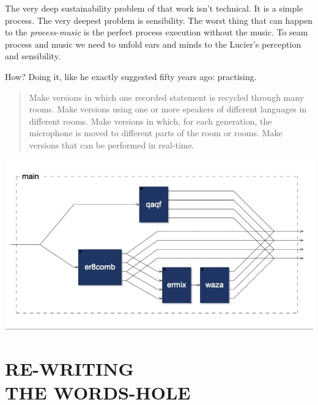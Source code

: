 \documentclass[
	a0,
	portrait
	]{a0poster}
\begin{document}
\begin{multicols}{4}
The very deep sustainability problem of that work isn't technical. It is a simple process. The very deepest problem is sensibility. The worst thing that can happen to the \emph{process-music} is the perfect process execution without the music. To seam process and music we need to unfold ears and minds to the Lucier's perception and sensibility. 

How? Doing it, like he exactly suggested fifty years ago: practising. 

\vfill

\begin{quotation}
\begin{it}
\begin{flushright}
\noindent Make versions in which one recorded statement is recycled through many rooms. Make versions using one or more speakers of different languages in different rooms. Make versions in which, for each generation, the microphone is moved to different parts of the room or rooms. Make versions that can be performed in real-time.
\end{flushright}
\end{it}
\end{quotation}

\columnbreak


\begin{center}
\includegraphics[width=1.\linewidth]{main}
\end{center}

\section*{\color{cbordeaux}RE-WRITING \\ THE WORDS-HOLE}


\end{multicols}
\end{document}
